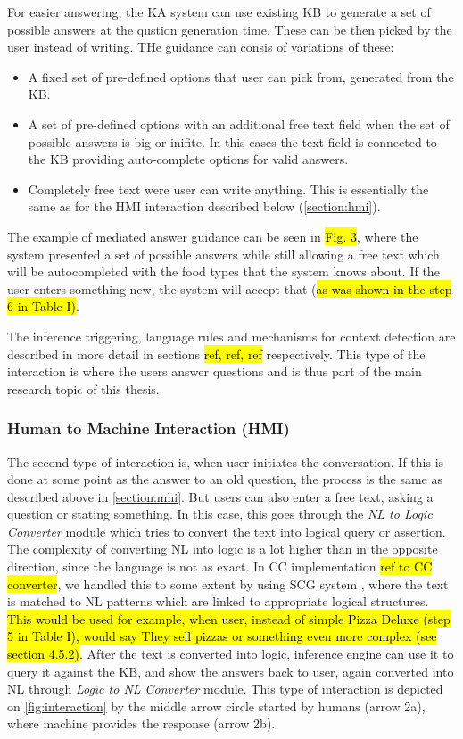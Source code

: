 For easier answering, the KA system can use existing KB to generate a set of 
possible answers at the qustion generation time. These can be then picked by
the user instead of writing. THe guidance can consis of variations of these:
\begin{itemize}
	\item A fixed set of pre-defined options that user can pick from, generated
	from the KB.
	\item A set of pre-defined options with an additional free text field when
	the set of possible answers is big or inifite. In this cases the text field
	is connected to the KB providing auto-complete options for valid answers.
	\item Completely free text were user can write anything. This is essentially
	the same as for the HMI interaction described below (\autoref{section:hmi}).
\end{itemize}

The example of mediated answer guidance can be seen in \hl{Fig. 3}, where the 
system presented a set of possible answers while still allowing a free text 
which will be autocompleted with the food types that the system knows about. 
If the user enters something new, the system will accept that (\hl{as was shown 
in the step 6 in Table I)}.

The inference triggering, language rules and mechanisms for context detection
are described in more detail in sections \hl{ref, ref, ref} respectively. This
type of the interaction is where the users answer questions and is thus part of
the main research topic of this thesis.

\subsubsection{Human to Machine Interaction (HMI)}
\label{section:hmi}
The second type of interaction is, when user initiates the conversation. 
If this is done at some point as the answer to an old question, the process is 
the same as described above in \autoref{section:mhi}. But users can also enter a 
free text, asking a question or stating something. In this case, this goes 
through the \emph{NL to Logic Converter} module which tries to convert the
text into logical query or assertion. The complexity of converting NL into logic 
is a lot higher than in the opposite direction, since the language is not
as exact. In CC implementation \hl{ref to CC converter}, we handled this to
some extent by using SCG system \parencite{Schneider2015}, where the text
is matched to NL patterns which are linked to appropriate logical structures.
\hl{This would be used for example, when user, instead of simple Pizza Deluxe 
(step 5 in Table I), would say They sell pizzas or something even more complex 
(see section 4.5.2)}. After the text is converted into logic, inference engine 
can use it to query it against the KB, and show the answers back to user, again 
converted into NL through \emph{Logic to NL Converter} module. This type of
interaction is depicted on \autoref{fig:interaction} by the middle arrow circle
started by humans (arrow 2a), where machine provides the response (arrow 2b).

